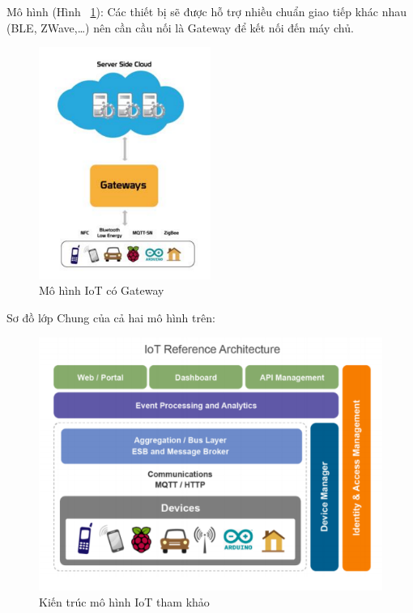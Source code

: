 Mô hình (Hình ~\ref{fig:pic6}): Các thiết bị sẽ được hỗ trợ nhiều chuẩn giao tiếp khác nhau (BLE, ZWave,…) nên cần cầu nối là Gateway để kết nối đến máy chủ. 
	
	

\begin{figure}[H] 
\centering    
\includegraphics[width=0.5\textwidth]{pic6}
\caption[Mô hình IoT có Gateway]{Mô hình IoT có Gateway}
\label{fig:pic6}
\end{figure}


Sơ đồ lớp Chung của cả hai mô hình trên:


\begin{figure}[H] 
\centering    
\includegraphics[width=1\textwidth]{pic7}
\caption[Kiến trúc mô hình IoT tham khảo]{Kiến trúc mô hình IoT tham khảo}
\label{fig:pic7}
\end{figure}



